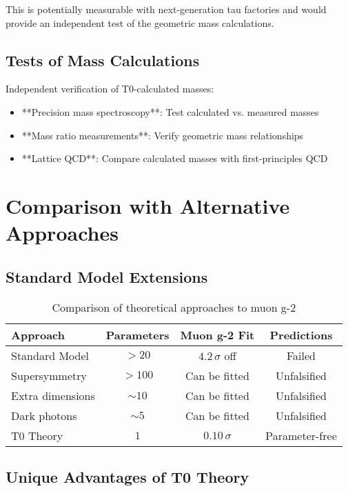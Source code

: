 \documentclass[12pt,a4paper]{article}
\numberwithin{equation}{section}
\begin{document}
	This is potentially measurable with next-generation tau factories and would provide an independent test of the geometric mass calculations.
	
	\subsection{Tests of Mass Calculations}
	
	Independent verification of T0-calculated masses:
	\begin{itemize}
		\item **Precision mass spectroscopy**: Test calculated vs. measured masses
		\item **Mass ratio measurements**: Verify geometric mass relationships
		\item **Lattice QCD**: Compare calculated masses with first-principles QCD
	\end{itemize}
	
	\section{Comparison with Alternative Approaches}
	
	\subsection{Standard Model Extensions}
	
	\begin{table}[h]
		\centering
		\begin{tabular}{@{}lccc@{}}
			\toprule
			\textbf{Approach} & \textbf{Parameters} & \textbf{Muon g-2 Fit} & \textbf{Predictions} \\
			\midrule
			Standard Model & $>20$ & $4.2\,\sigma$ off & Failed \\
			Supersymmetry & $>100$ & Can be fitted & Unfalsified \\
			Extra dimensions & $\sim 10$ & Can be fitted & Unfalsified \\
			Dark photons & $\sim 5$ & Can be fitted & Unfalsified \\
			T0 Theory & $1$ & $0.10\,\sigma$ & Parameter-free \\
			\bottomrule
		\end{tabular}
		\caption{Comparison of theoretical approaches to muon g-2}
	\end{table}
	
	\subsection{Unique Advantages of T0 Theory}
	
\end{document}
